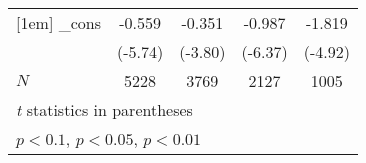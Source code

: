 {\begin{tabular}{l*{4}{c}}
[1em]
\_cons      &      -0.559\sym{***}&      -0.351\sym{***}&      -0.987\sym{***}&      -1.819\sym{***}\\
            &     (-5.74)         &     (-3.80)         &     (-6.37)         &     (-4.92)         \\
\hline
\(N\)       &        5228         &        3769         &        2127         &        1005         \\
\hline\hline
\multicolumn{5}{l}{\footnotesize \textit{t} statistics in parentheses}\\
\multicolumn{5}{l}{\footnotesize \sym{*} \(p<0.1\), \sym{**} \(p<0.05\), \sym{***} \(p<0.01\)}\\
\end{tabular}
}
